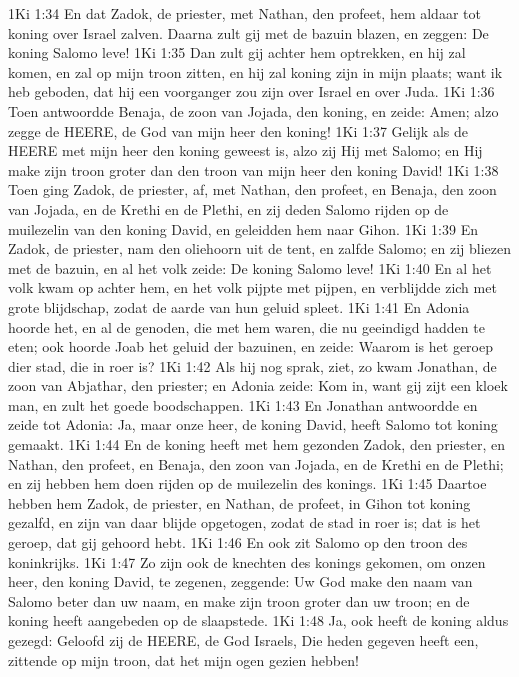 1Ki 1:34  En dat Zadok, de priester, met Nathan, den profeet, hem aldaar tot koning over Israel zalven. Daarna zult gij met de bazuin blazen, en zeggen: De koning Salomo leve!
1Ki 1:35  Dan zult gij achter hem optrekken, en hij zal komen, en zal op mijn troon zitten, en hij zal koning zijn in mijn plaats; want ik heb geboden, dat hij een voorganger zou zijn over Israel en over Juda.
1Ki 1:36  Toen antwoordde Benaja, de zoon van Jojada, den koning, en zeide: Amen; alzo zegge de HEERE, de God van mijn heer den koning!
1Ki 1:37  Gelijk als de HEERE met mijn heer den koning geweest is, alzo zij Hij met Salomo; en Hij make zijn troon groter dan den troon van mijn heer den koning David!
1Ki 1:38  Toen ging Zadok, de priester, af, met Nathan, den profeet, en Benaja, den zoon van Jojada, en de Krethi en de Plethi, en zij deden Salomo rijden op de muilezelin van den koning David, en geleidden hem naar Gihon.
1Ki 1:39  En Zadok, de priester, nam den oliehoorn uit de tent, en zalfde Salomo; en zij bliezen met de bazuin, en al het volk zeide: De koning Salomo leve!
1Ki 1:40  En al het volk kwam op achter hem, en het volk pijpte met pijpen, en verblijdde zich met grote blijdschap, zodat de aarde van hun geluid spleet.
1Ki 1:41  En Adonia hoorde het, en al de genoden, die met hem waren, die nu geeindigd hadden te eten; ook hoorde Joab het geluid der bazuinen, en zeide: Waarom is het geroep dier stad, die in roer is?
1Ki 1:42  Als hij nog sprak, ziet, zo kwam Jonathan, de zoon van Abjathar, den priester; en Adonia zeide: Kom in, want gij zijt een kloek man, en zult het goede boodschappen.
1Ki 1:43  En Jonathan antwoordde en zeide tot Adonia: Ja, maar onze heer, de koning David, heeft Salomo tot koning gemaakt.
1Ki 1:44  En de koning heeft met hem gezonden Zadok, den priester, en Nathan, den profeet, en Benaja, den zoon van Jojada, en de Krethi en de Plethi; en zij hebben hem doen rijden op de muilezelin des konings.
1Ki 1:45  Daartoe hebben hem Zadok, de priester, en Nathan, de profeet, in Gihon tot koning gezalfd, en zijn van daar blijde opgetogen, zodat de stad in roer is; dat is het geroep, dat gij gehoord hebt.
1Ki 1:46  En ook zit Salomo op den troon des koninkrijks.
1Ki 1:47  Zo zijn ook de knechten des konings gekomen, om onzen heer, den koning David, te zegenen, zeggende: Uw God make den naam van Salomo beter dan uw naam, en make zijn troon groter dan uw troon; en de koning heeft aangebeden op de slaapstede.
1Ki 1:48  Ja, ook heeft de koning aldus gezegd: Geloofd zij de HEERE, de God Israels, Die heden gegeven heeft een, zittende op mijn troon, dat het mijn ogen gezien hebben!
